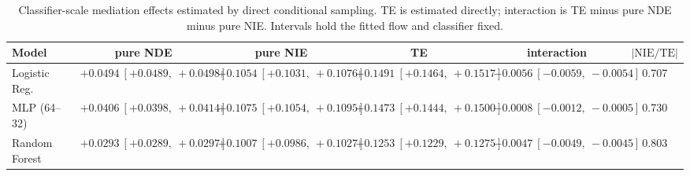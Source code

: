 \begin{table}[htbp]
  \centering
  \caption{Classifier-scale mediation effects estimated by direct conditional sampling. TE is estimated directly; interaction is TE minus pure NDE minus pure NIE. Intervals hold the fitted flow and classifier fixed.}
  \label{tab:german_synth_m05_gap_overall}
  \begin{tabular}{lccccc}
    \toprule
    Model & pure NDE & pure NIE & TE & interaction & $|\mathrm{NIE}/\mathrm{TE}|$ \\
    \midrule
    Logistic Reg. & $+0.0494\ [+0.0489,\ +0.0498]$ & $+0.1054\ [+0.1031,\ +0.1076]$ & $+0.1491\ [+0.1464,\ +0.1517]$ & $-0.0056\ [-0.0059,\ -0.0054]$ & 0.707 \\
    MLP (64--32) & $+0.0406\ [+0.0398,\ +0.0414]$ & $+0.1075\ [+0.1054,\ +0.1095]$ & $+0.1473\ [+0.1444,\ +0.1500]$ & $-0.0008\ [-0.0012,\ -0.0005]$ & 0.730 \\
    Random Forest & $+0.0293\ [+0.0289,\ +0.0297]$ & $+0.1007\ [+0.0986,\ +0.1027]$ & $+0.1253\ [+0.1229,\ +0.1275]$ & $-0.0047\ [-0.0049,\ -0.0045]$ & 0.803 \\
    \bottomrule
  \end{tabular}
\end{table}